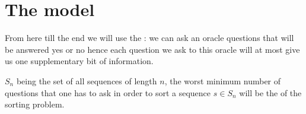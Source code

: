 \section{The model}
\label{tree:sorting:model}

From here till the end we will use the  : we can ask an oracle questions that will be answered yes or no hence each question we ask to this oracle will at most give us one supplementary bit of information.

$S_n$ being the set of all sequences of length $n$, the worst minimum number of questions that one has to ask in order to sort a sequence $s \in S_n$ will be the  of the sorting problem.